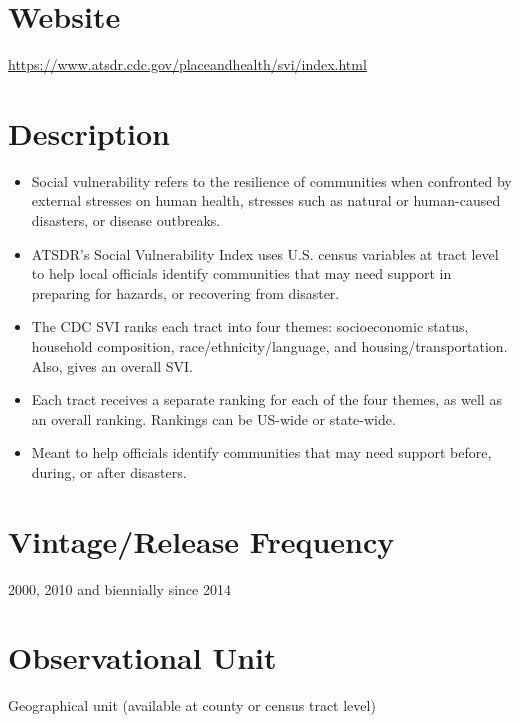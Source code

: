 \documentclass[
]{book}
\providecommand{\tightlist}{%
  \setlength{\itemsep}{0pt}\setlength{\parskip}{0pt}}
\begin{document}
\hypertarget{website-81}{%
\section{Website}\label{website-81}}

\url{https://www.atsdr.cdc.gov/placeandhealth/svi/index.html}

\hypertarget{description-81}{%
\section{Description}\label{description-81}}

\begin{itemize}
\tightlist
\item
  Social vulnerability refers to the resilience of communities when confronted by external stresses on human health, stresses such as natural or human-caused disasters, or disease outbreaks.
\item
  ATSDR's Social Vulnerability Index uses U.S. census variables at tract level to help local officials identify communities that may need support in preparing for hazards, or recovering from disaster.
\item
  The CDC SVI ranks each tract into four themes: socioeconomic status, household composition, race/ethnicity/language, and housing/transportation. Also, gives an overall SVI.
\item
  Each tract receives a separate ranking for each of the four themes, as well as an overall ranking. Rankings can be US-wide or state-wide.
\item
  Meant to help officials identify communities that may need support before, during, or after disasters.
\end{itemize}

\hypertarget{vintagerelease-frequency-81}{%
\section{Vintage/Release Frequency}\label{vintagerelease-frequency-81}}

2000, 2010 and biennially since 2014

\hypertarget{observational-unit-81}{%
\section{Observational Unit}\label{observational-unit-81}}

Geographical unit (available at county or census tract level)
\end{document}
